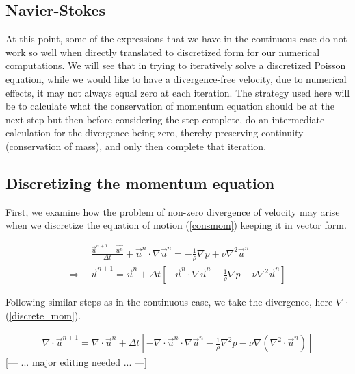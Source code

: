 \documentclass[11pt]{article}
\begin{document}
{\subsection{Navier-Stokes}
At this point, some of the expressions that we have in the continuous case do not work so well
when directly translated to discretized form for our numerical computations.
We will see that in trying to iteratively solve a discretized Poisson equation, while we would
like to have a divergence-free velocity,
due to numerical effects, it may not always equal zero at each iteration. The strategy used
here will be to calculate what the conservation of momentum equation should be at the next step
but then before considering the step complete, do an intermediate calculation for the divergence
being zero, thereby preserving continuity (conservation of mass), and only then complete that
iteration.

\subsection{Discretizing the momentum equation}
First, we examine how the problem of non-zero divergence of velocity may arise when we
discretize the equation of motion (\ref{consmom}) keeping it in vector form.

\begin{align}
& \frac{\vec{u}^{n+1} - \vec{u^n}}{\Delta t} + \vec{u}^n \cdot \nabla \vec{u}^n
 = -\frac{1}{\rho} \nabla p + \nu \nabla^2 \vec{u}^n \nonumber \\
\Rightarrow ~~&
\vec{u}^{n+1} = \vec{u}^n + \Delta t \left[ -\vec{u}^n \cdot \nabla \vec{u}^n
			  - \frac{1}{\rho} \nabla p - \nu \nabla^2 \vec{u}^n \right]
\label{discrete_mom}
\end{align}

Following similar steps as in the continuous case, we take the divergence,
here $\nabla \cdot$(\ref{discrete_mom}).

\begin{align}
\nabla \cdot \vec{u}^{n+1} = \nabla \cdot \vec{u}^n
 + \Delta t \left[ -\nabla \cdot \vec{u}^n \cdot \nabla \vec{u}^n
			      - \frac{1}{\rho} \nabla^2 p - \nu \nabla (\nabla^2 \cdot \vec{u}^n) \right]
\label{diverged_mom}
\end{align}
[--- ... major editing needed ... ---]

}
\end{document}
